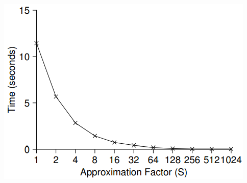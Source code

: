 \documentclass[8pt,a4paper,landscape]{extarticle}
\begin{document}
\begin{multicols*}{3}
\begin{minipage}{.5\linewidth}
\end{minipage}
\begin{minipage}{.5\linewidth}
  \centering
  \includegraphics[width=.8\linewidth]{imgs/scaling_approx_cnter}
\end{minipage}

\end{multicols*}
\end{document}
